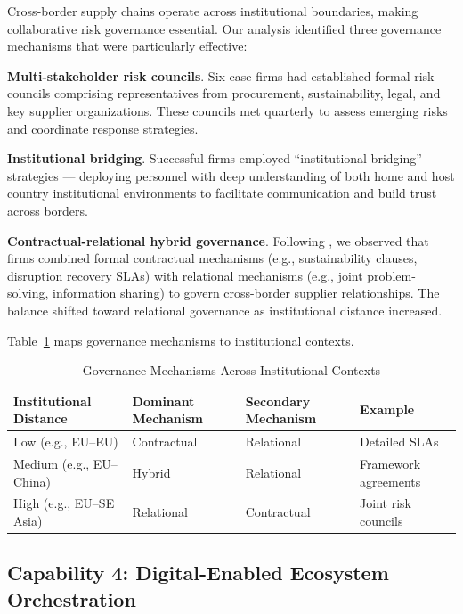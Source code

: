 \documentclass[12pt,a4paper,twoside]{article}
\begin{document}
Cross-border supply chains operate across institutional boundaries, making
collaborative risk governance essential.  Our analysis identified three
governance mechanisms that were particularly effective:

\textbf{Multi-stakeholder risk councils}.  Six case firms had established formal
risk councils comprising representatives from procurement, sustainability,
legal, and key supplier organizations.  These councils met quarterly to assess
emerging risks and coordinate response strategies.

\textbf{Institutional bridging}.  Successful firms employed ``institutional
bridging'' strategies --- deploying personnel with deep understanding of both
home and host country institutional environments to facilitate communication
and build trust across borders.

\textbf{Contractual-relational hybrid governance}.  Following
\citet{cao2015revisiting}, we observed that firms combined formal contractual
mechanisms (e.g., sustainability clauses, disruption recovery SLAs) with
relational mechanisms (e.g., joint problem-solving, information sharing) to
govern cross-border supplier relationships.  The balance shifted toward
relational governance as institutional distance increased.

Table~\ref{tab:governance} maps governance mechanisms to institutional contexts.

\begin{table}[htbp]
\centering
\caption{Governance Mechanisms Across Institutional Contexts}
\label{tab:governance}
\begin{tabular}{@{}p{2.5cm}p{3cm}p{3cm}p{3cm}@{}}
\toprule
\textbf{Institutional Distance} & \textbf{Dominant Mechanism} & \textbf{Secondary Mechanism} & \textbf{Example} \\
\midrule
Low (e.g., EU--EU) & Contractual & Relational & Detailed SLAs \\
Medium (e.g., EU--China) & Hybrid & Relational & Framework agreements \\
High (e.g., EU--SE Asia) & Relational & Contractual & Joint risk councils \\
\bottomrule
\end{tabular}
\end{table}

\subsection{Capability 4: Digital-Enabled Ecosystem Orchestration}
\end{document}
